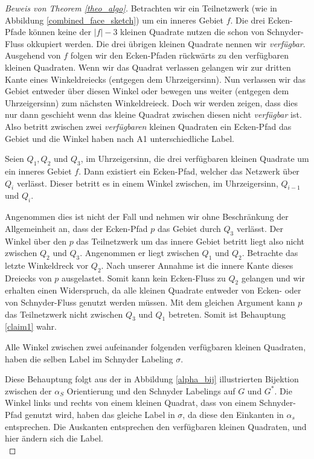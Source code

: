 \begin{proof}[Beweis von Theorem \ref{theo_algo}]
Betrachten wir ein Teilnetzwerk (wie in Abbildung \ref{combined_face_sketch}) um ein inneres Gebiet $f$. Die drei Ecken-Pfade können keine der $|f|-3$ kleinen Quadrate nutzen die schon von Schnyder-Fluss okkupiert werden. Die drei übrigen kleinen Quadrate nennen wir \textit{verfügbar}. Ausgehend von $f$ folgen wir den Ecken-Pfaden rückwärts zu den verfügbaren kleinen Quadraten. Wenn wir das Quadrat verlassen gelangen wir zur dritten Kante eines Winkeldreiecks (entgegen dem Uhrzeigersinn). Nun verlassen wir das Gebiet entweder über diesen Winkel oder bewegen uns weiter (entgegen dem Uhrzeigersinn) zum nächsten Winkeldreieck. Doch wir werden zeigen, dass dies nur dann geschieht wenn das kleine Quadrat zwischen diesen nicht \textit{verfügbar} ist. Also betritt zwischen zwei \textit{verfügbaren} kleinen Quadraten ein Ecken-Pfad das Gebiet und die Winkel haben nach A1 unterschiedliche Label.

\begin{claim}\label{claim1}
Seien $Q_1,Q_2$ und $Q_3$, im Uhrzeigersinn, die drei verfügbaren kleinen Quadrate um ein inneres Gebiet $f$. Dann existiert ein Ecken-Pfad, welcher das Netzwerk über $Q_i$ verlässt. Dieser betritt es in einem Winkel zwischen, im Uhrzeigersinn, $Q_{i-1}$ und $Q_i$.
\end{claim}

Angenommen dies ist nicht der Fall und nehmen wir ohne Beschränkung der Allgemeinheit an, dass der Ecken-Pfad $p$ das Gebiet durch $Q_3$ verlässt. Der Winkel über den $p$ das Teilnetzwerk um das innere Gebiet betritt liegt also nicht zwischen $Q_2$ und $Q_3$. Angenommen er liegt zwischen $Q_1$ und $Q_2$. Betrachte das letzte Winkeldreck vor $Q_2$. Nach unserer Annahme ist die innere Kante dieses Dreiecks von $p$ ausgelastet. Somit kann kein Ecken-Fluss zu $Q_2$ gelangen und wir erhalten einen Widerspruch, da alle kleinen Quadrate entweder von Ecken- oder von Schnyder-Fluss genutzt werden müssen. Mit dem gleichen Argument kann $p$ das Teilnetzwerk nicht zwischen $Q_3$ und $Q_1$ betreten. Somit ist Behauptung \ref{claim1} wahr.

\begin{claim}
Alle Winkel zwischen zwei aufeinander folgenden verfügbaren kleinen Quadraten, haben die selben Label im Schnyder Labeling $\sigma$.
\end{claim}
Diese Behauptung folgt aus der in Abbildung \ref{alpha_bij} illustrierten Bijektion zwischen der $\alpha_S$ Orientierung und den Schnyder Labelings auf $G$ und $G^*$. Die Winkel links und rechts von einem kleinen Quadrat, dass von einem Schnyder-Pfad genutzt wird, haben das gleiche Label in $\sigma$, da diese den Einkanten in $\alpha_s$ entsprechen. Die Auskanten entsprechen den verfügbaren kleinen Quadraten, und hier ändern sich die Label.\\


\end{proof}
